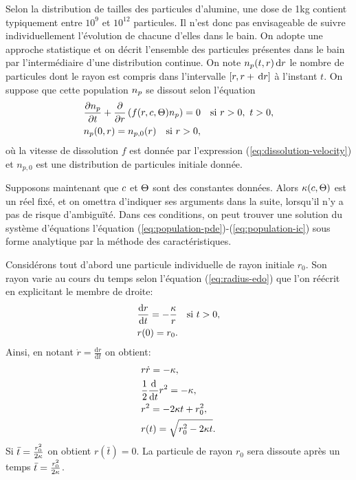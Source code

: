 Selon la distribution de tailles des particules d'alumine, une dose de
\num{1}\si{\kilo\gram} contient typiquement entre $10^9$ et $10^{12}$
particules. Il n'est donc pas envisageable de suivre individuellement
l'évolution de chacune d'elles dans le bain. On adopte une approche
statistique \cite{Hofer2011} et on décrit l'ensemble des particules
présentes dans le bain par l'intermédiaire d'une distribution
continue. On note $n_p(t, r)\,\mathrm dr$ le nombre de particules dont le
rayon est compris dans l'intervalle $[r, r + \,\mathrm dr]$ à l'instant
$t$. On suppose que cette population $n_p$ se dissout selon
l'équation
\begin{align}
&\frac{\partial n_p}{\partial t} + \frac{\partial
}{\partial r}\left( f(r,c,\Theta)n_p \right) = 0\quad \text{si } r > 0,\ t > 0,\label{eq:population-pde}\\
&n_p(0, r) = n_{p,0}(r) \quad \text{si } r > 0,\label{eq:population-ic}
\end{align}
où la vitesse de dissolution $f$ est donnée par l'expression
(\ref{eq:dissolution-velocity}) et $n_{p,0}$ est une distribution de
particules initiale donnée.

Supposons maintenant que $c$ et $\Theta$ sont des
constantes données. Alors
$\kappa(c,\Theta)$ est un réel fixé, et
on omettra d'indiquer ses arguments dans la suite, lorsqu'il n'y a pas
de risque d'ambiguïté. Dans ces conditions, on peut trouver une
solution du système d'équations l'équation
(\ref{eq:population-pde})-(\ref{eq:population-ic}) sous forme
analytique par la méthode des caractéristiques.

Considérons tout d'abord une particule individuelle de rayon initiale
$r_0$. Son rayon varie au cours du temps selon l'équation
(\ref{eq:radius-edo}) que l'on réécrit en explicitant le membre de
droite:
\begin{align*}
  &\frac{\mathrm d r}{\mathrm d t} = -\frac{\kappa}{r} \quad \text{si } t
  > 0,\\
  & r(0) = r_0.
\end{align*}
Ainsi, en notant $\dot r = \frac{\mathrm dr}{\mathrm dt}$ on obtient:
\begin{align}
  &r\dot r = -\kappa,\nonumber\\
  &\frac{1}{2}\frac{\mathrm d}{\mathrm dt}r^2 = -\kappa,\nonumber\\
  &r^2 = -2\kappa t + r_0^2,\nonumber\\
  &r(t) = \sqrt{r_0^2-2\kappa t}.\label{eq:particle-exact}
\end{align}
Si $\bar t = \frac{r_0^2}{2\kappa}$ on obtient $r(\bar
t) = 0$. La particule de rayon $r_0$ sera dissoute après un temps $\bar
t = \frac{r_0^2}{2\kappa}$.

